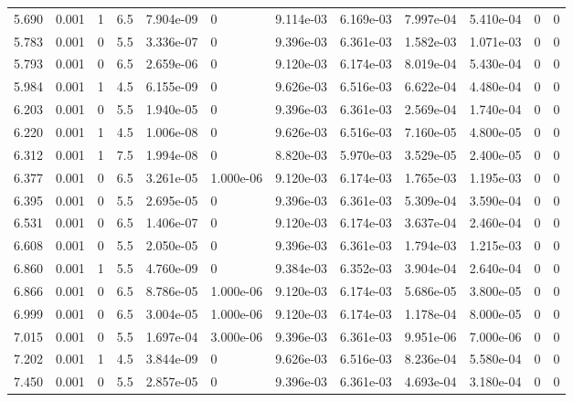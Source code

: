 \documentclass[preview]{standalone}
\begin{document}
{{{\begin{tabular}{L{1.2cm}C{1.2cm} C{0.3cm}C{0.5cm} C{1.4cm}C{1.4cm} C{1.4cm}C{1.4cm} C{1.6cm}C{1.6cm} C{1.6cm}C{1.6cm}}
  5.690  &  0.001  & 1     & 6.5 &  7.904e-09  & 0  &  9.114e-03&   6.169e-03& 7.997e-04 & 5.410e-04   &  0 & 0  \\ 
  5.783  &  0.001  & 0     & 5.5 &  3.336e-07  & 0  &  9.396e-03&   6.361e-03& 1.582e-03 & 1.071e-03   &  0 & 0  \\ 
  5.793  &  0.001  & 0     & 6.5 &  2.659e-06  & 0  &  9.120e-03&   6.174e-03& 8.019e-04 & 5.430e-04   &  0 & 0  \\ 
  5.984  &  0.001  & 1     & 4.5 &  6.155e-09  & 0  &  9.626e-03&   6.516e-03& 6.622e-04 & 4.480e-04   &  0 & 0  \\ 
  6.203  &  0.001  & 0     & 5.5 &  1.940e-05  & 0  &  9.396e-03&   6.361e-03& 2.569e-04 & 1.740e-04   &  0 & 0  \\ 
  6.220  &  0.001  & 1     & 4.5 &  1.006e-08  & 0  &  9.626e-03&   6.516e-03& 7.160e-05 & 4.800e-05   &  0 & 0  \\ 
  6.312  &  0.001  & 1     & 7.5 &  1.994e-08  & 0  &  8.820e-03&   5.970e-03& 3.529e-05 & 2.400e-05   &  0 & 0  \\ 
  6.377  &  0.001  & 0     & 6.5 &  3.261e-05  & 1.000e-06  &  9.120e-03&   6.174e-03& 1.765e-03 & 1.195e-03   &  0 & 0  \\ 
  6.395  &  0.001  & 0     & 5.5 &  2.695e-05  & 0  &  9.396e-03&   6.361e-03& 5.309e-04 & 3.590e-04   &  0 & 0  \\ 
  6.531  &  0.001  & 0     & 6.5 &  1.406e-07  & 0  &  9.120e-03&   6.174e-03& 3.637e-04 & 2.460e-04   &  0 & 0  \\ 
  6.608  &  0.001  & 0     & 5.5 &  2.050e-05  & 0  &  9.396e-03&   6.361e-03& 1.794e-03 & 1.215e-03   &  0 & 0  \\ 
  6.860  &  0.001  & 1     & 5.5 &  4.760e-09  & 0  &  9.384e-03&   6.352e-03& 3.904e-04 & 2.640e-04   &  0 & 0  \\ 
  6.866  &  0.001  & 0     & 6.5 &  8.786e-05  & 1.000e-06  &  9.120e-03&   6.174e-03& 5.686e-05 & 3.800e-05   &  0 & 0  \\ 
  6.999  &  0.001  & 0     & 6.5 &  3.004e-05  & 1.000e-06  &  9.120e-03&   6.174e-03& 1.178e-04 & 8.000e-05   &  0 & 0  \\ 
  7.015  &  0.001  & 0     & 5.5 &  1.697e-04  & 3.000e-06  &  9.396e-03&   6.361e-03& 9.951e-06 & 7.000e-06   &  0 & 0  \\ 
  7.202  &  0.001  & 1     & 4.5 &  3.844e-09  & 0  &  9.626e-03&   6.516e-03& 8.236e-04 & 5.580e-04   &  0 & 0  \\ 
  7.450  &  0.001  & 0     & 5.5 &  2.857e-05  & 0  &  9.396e-03&   6.361e-03& 4.693e-04 & 3.180e-04   &  0 & 0  \\ 

\end{tabular}}}}
\end{document}
